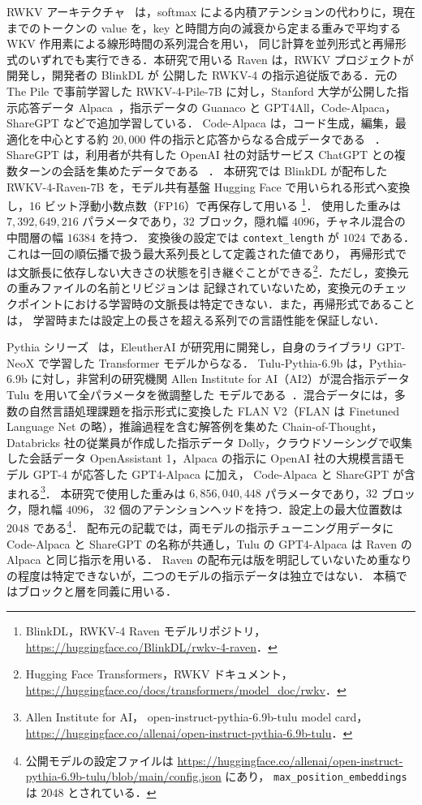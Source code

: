 \documentclass[techrep,noauthor]{ipsj}
\begin{document}
RWKV アーキテクチャ~\cite{peng-etal-2023-rwkv} は，softmax による内積アテンションの代わりに，現在までのトークンの value を，key と時間方向の減衰から定まる重みで平均する WKV 作用素による線形時間の系列混合を用い，
同じ計算を並列形式と再帰形式のいずれでも実行できる．本研究で用いる Raven は，RWKV プロジェクトが開発し，開発者の BlinkDL が
公開した RWKV-4 の指示追従版である．元の The Pile で事前学習した RWKV-4-Pile-7B に対し，Stanford 大学が公開した指示応答データ Alpaca~\cite{alpaca}，指示データの Guanaco と
GPT4All，Code-Alpaca，ShareGPT などで追加学習している．
Code-Alpaca は，コード生成，編集，最適化を中心とする約 $20{,}000$ 件の指示と応答からなる合成データである
~\cite{codealpaca}．
ShareGPT は，利用者が共有した OpenAI 社の対話サービス ChatGPT との複数ターンの会話を集めたデータである
~\cite{lmsys-fastchat}．
本研究では BlinkDL が配布した RWKV-4-Raven-7B を，モデル共有基盤 Hugging Face で用いられる形式へ変換し，16 ビット浮動小数点数（FP16）で再保存して用いる
\footnote{BlinkDL，RWKV-4 Raven モデルリポジトリ，
\url{https://huggingface.co/BlinkDL/rwkv-4-raven}．}．
使用した重みは $7{,}392{,}649{,}216$ パラメータであり，$32$ ブロック，隠れ幅 $4096$，チャネル混合の中間層の幅 $16384$ を持つ．
変換後の設定では \texttt{context\_length} が $1024$ である．これは一回の順伝播で扱う最大系列長として定義された値であり，
再帰形式では文脈長に依存しない大きさの状態を引き継ぐことができる\footnote{Hugging Face Transformers，RWKV ドキュメント，
\url{https://huggingface.co/docs/transformers/model_doc/rwkv}．}．ただし，変換元の重みファイルの名前とリビジョンは
記録されていないため，変換元のチェックポイントにおける学習時の文脈長は特定できない．また，再帰形式であることは，
学習時または設定上の長さを超える系列での言語性能を保証しない．

Pythia シリーズ~\cite{3618408.3618510} は，EleutherAI が研究用に開発し，自身のライブラリ GPT-NeoX で学習した Transformer モデルからなる．
Tulu-Pythia-6.9b は，Pythia-6.9b に対し，非営利の研究機関 Allen Institute for AI（AI2）が混合指示データ Tulu を用いて全パラメータを微調整した
モデルである~\cite{3666122.3669390}．混合データには，多数の自然言語処理課題を指示形式に変換した FLAN V2（FLAN は Finetuned Language Net の略），推論過程を含む解答例を集めた Chain-of-Thought，
Databricks 社の従業員が作成した指示データ Dolly，クラウドソーシングで収集した会話データ OpenAssistant 1，Alpaca の指示に OpenAI 社の大規模言語モデル GPT-4 が応答した GPT4-Alpaca に加え，
Code-Alpaca と ShareGPT が含まれる\footnote{Allen Institute for AI，
open-instruct-pythia-6.9b-tulu model card，
\url{https://huggingface.co/allenai/open-instruct-pythia-6.9b-tulu}．}．
本研究で使用した重みは $6{,}856{,}040{,}448$ パラメータであり，$32$ ブロック，隠れ幅 $4096$，
$32$ 個のアテンションヘッドを持つ．設定上の最大位置数は $2048$ である\footnote{公開モデルの設定ファイルは
\url{https://huggingface.co/allenai/open-instruct-pythia-6.9b-tulu/blob/main/config.json} にあり，
\texttt{max\_position\_embeddings} は $2048$ とされている．}．
配布元の記載では，両モデルの指示チューニング用データに Code-Alpaca と ShareGPT の名称が共通し，Tulu の GPT4-Alpaca は Raven の Alpaca と同じ指示を用いる．
Raven の配布元は版を明記していないため重なりの程度は特定できないが，二つのモデルの指示データは独立ではない．
本稿ではブロックと層を同義に用いる．
\end{document}
